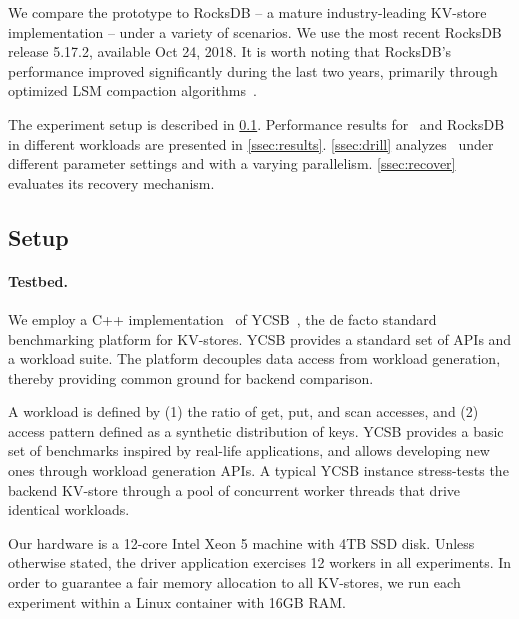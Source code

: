 We  compare the \sys\/ prototype to RocksDB -- a mature industry-leading KV-store implementation  -- under a variety of scenarios.  We use the most recent RocksDB release 5.17.2, available Oct 24, 2018.  
It is worth noting that RocksDB's performance improved significantly during the last two years, primarily through 
optimized LSM compaction algorithms~\cite{CallaghanCompaction}.   

The experiment setup is described in \cref{ssec:setup}. 
Performance results for \sys\ and RocksDB in 
different workloads are presented in \cref{ssec:results}. 
\cref{ssec:drill} analyzes \sys\ under different parameter settings and with a varying parallelism.
\cref{ssec:recover} evaluates its recovery mechanism. 
 

\subsection{Setup}
\label{ssec:setup} 

\paragraph{Testbed.} We employ a C++ implementation~\cite{Cpp-YCSB} of YCSB~\cite{YCSB}, the  de facto standard  
benchmarking platform for KV-stores. 
YCSB provides a standard set of APIs and a workload suite. 
The platform decouples data access from workload generation, 
thereby providing common ground for backend comparison. 

A workload is defined by  (1) the ratio of get, put, and scan accesses, and (2) access pattern defined as a synthetic distribution of keys. 
YCSB provides a basic set of benchmarks  inspired by real-life applications, and allows developing new ones through workload 
generation APIs. A typical YCSB instance stress-tests the backend KV-store through a pool of concurrent worker threads that drive identical
workloads. %

Our hardware is a 12-core Intel Xeon 5 machine with 4TB SSD disk. Unless otherwise stated, the driver application 
exercises 12 workers in all experiments. In order to guarantee a fair memory allocation to all KV-stores, we run each 
experiment within a Linux container with 16GB RAM. 

